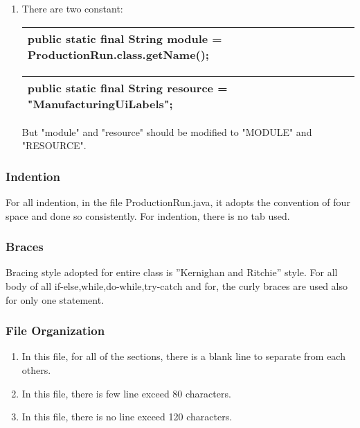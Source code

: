 \documentclass{article}
\begin{document}
\begin{enumerate}
\item
There are two constant:\newline
\begin{table}[hpb]
	\label{my-label}
	\begin{tabular}{|l|}
		\hline
		public static final String module 
		= ProductionRun.class.getName();\newline\\
		\hline
	\end{tabular}
\end{table} 
\begin{table}[hpb]
	\label{my-label}
	\begin{tabular}{|l|}
		\hline
		public static final String resource 
		= "ManufacturingUiLabels";\newline\\
		\hline
	\end{tabular}
\end{table} 
But "module" and "resource" should be modified to "MODULE" and "RESOURCE".
\end{enumerate}

\subsubsection{Indention}
For all indention, in the file ProductionRun.java, it adopts the convention of four space and done so consistently.\newline
For indention, there is no tab used.
 
\subsubsection{Braces}
Bracing style adopted for entire class is ”Kernighan and Ritchie” style.\newline 
For all body of all if-else,while,do-while,try-catch and for, the curly braces are used also for only one statement.

\subsubsection{File Organization}
\begin{enumerate}
	\item In this file, for all of the sections, there is a blank line to separate from each others.
	\item In this file, there is few line exceed 80 characters.
	\item In this file, there is no line exceed 120 characters.
\end{enumerate}
\end{document}
